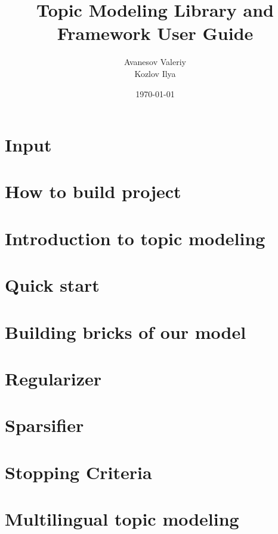 \documentclass{article}
\title{Topic Modeling Library and Framework User Guide}
\author{Avanesov Valeriy \\ Kozlov Ilya}
\date{\today}
\begin{document}
\maketitle

\newpage

\tableofcontents

\clearpage	\section{Input} \label{input} 
   
\clearpage	\section{How to build project}  \label{howToBuild} 

\clearpage	\section{Introduction to topic modeling}  \label{intro} 

\clearpage	\section{Quick start} \label{quickStart} 

\clearpage	\section{Building bricks of our model} \label{projectStructure} 

\clearpage	\section{Regularizer} \label{regularizer} 

\clearpage	\section{Sparsifier} \label{sparsifier} 

\clearpage	\section{Stopping Criteria} \label{stoppingCriteria} 

\clearpage	\section{Multilingual topic modeling} \label{multilingual}


 
\end{document}

